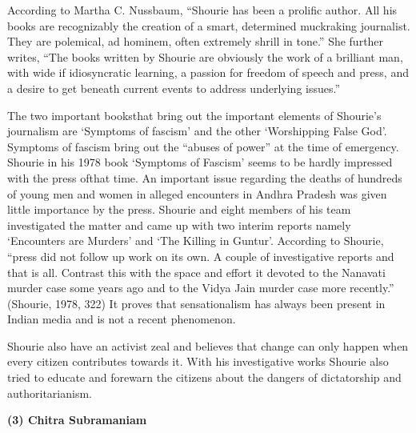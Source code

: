 \begin{multicols}{2}
\noi
According to Martha C. Nussbaum, “Shourie has been a prolific author. All his books are
recognizably the creation of a smart, determined muckraking journalist. They are polemical,
ad hominem, often extremely shrill in tone.” She further writes, “The books written by Shourie
are obviously the work of a brilliant man, with wide if idiosyncratic learning, a passion for freedom of speech and press, and a desire to get beneath current events to address underlying issues.”

\noi
The two important booksthat bring out the important elements of Shourie’s journalism
are ‘Symptoms of fascism’ and the other ‘Worshipping False God’. Symptoms of fascism bring
out the “abuses of power” at the time of emergency. Shourie in his 1978 book ‘Symptoms of
Fascism’ seems to be hardly impressed with the press ofthat time. An important issue regarding
the deaths of hundreds of young men and women in alleged encounters in Andhra Pradesh was
given little importance by the press. Shourie and eight members of his team investigated the
matter and came up with two interim reports namely ‘Encounters are Murders’ and ‘The Killing
in Guntur’. According to Shourie, “press did not follow up work on its own. A couple of
investigative reports and that is all. Contrast this with the space and effort it devoted to the
Nanavati murder case some years ago and to the Vidya Jain murder case more recently.”
(Shourie, 1978, 322) It proves that sensationalism has always been present in Indian media and
is not a recent phenomenon.

\noi
Shourie also have an activist zeal and believes that change can only happen when every citizen
contributes towards it. With his investigative works Shourie also tried to educate and forewarn
the citizens about the dangers of dictatorship and authoritarianism.

\noi
{\large \bfseries (3) Chitra Subramaniam}


\end{multicols}
